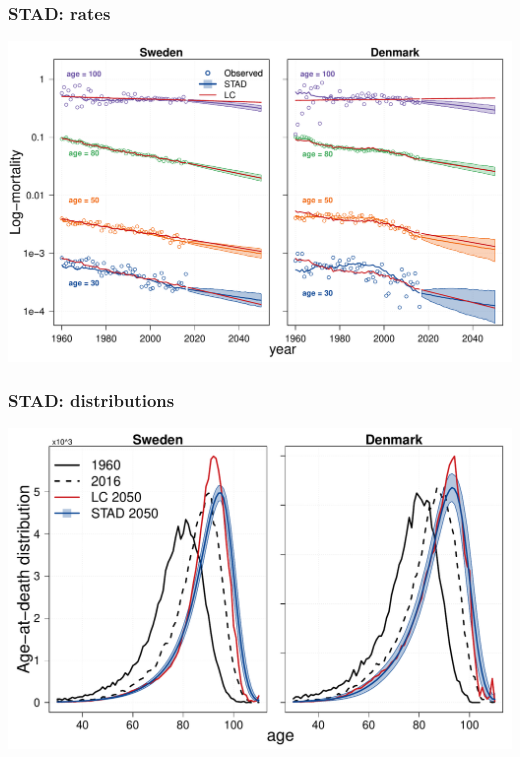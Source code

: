 \documentclass[12pt, xcolor=table]{beamer}  %
\begin{document}
\begin{frame}[noframenumbering]\frametitle{STAD: rates}

\vspace{-0.5cm}
%	
	
	\begin{center}	
		\vspace{0.2cm}
		
		\includegraphics[scale=.42]{Figures/Ch2/F6_2}
		
	\end{center}
	
\end{frame}

\begin{frame}[noframenumbering]\frametitle{STAD: distributions}

\vspace{-0.5cm}
	
	
	\begin{center}	
		\vspace{0.2cm}
		
		\includegraphics[scale=.42]{Figures/Ch2/F7}
		
	\end{center}
	
\end{frame}
\end{document}
